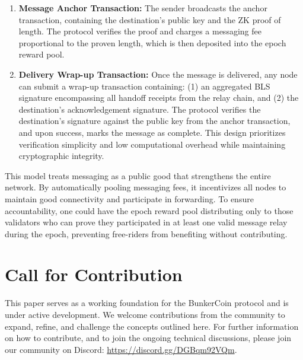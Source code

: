 \documentclass{article}
\begin{document}
\begin{enumerate}
    \item \textbf{Message Anchor Transaction:} The sender broadcasts the anchor transaction, containing the destination's public key and the ZK proof of length. The protocol verifies the proof and charges a messaging fee proportional to the proven length, which is then deposited into the epoch reward pool.
    \item \textbf{Delivery Wrap-up Transaction:} Once the message is delivered, any node can submit a wrap-up transaction containing: (1) an aggregated BLS signature encompassing all handoff receipts from the relay chain, and (2) the destination's acknowledgement signature. The protocol verifies the destination's signature against the public key from the anchor transaction, and upon success, marks the message as complete. This design prioritizes verification simplicity and low computational overhead while maintaining cryptographic integrity.
\end{enumerate}

This model treats messaging as a public good that strengthens the entire network. By automatically pooling messaging fees, it incentivizes all nodes to maintain good connectivity and participate in forwarding. To ensure accountability, one could have the epoch reward pool distributing only to those validators who can prove they participated in at least one valid message relay during the epoch, 
preventing free-riders from benefiting without contributing.

\section{Call for Contribution}

This paper serves as a working foundation for the BunkerCoin protocol and is under active development. We welcome contributions from the community to expand, refine, and challenge the concepts outlined here. For further information on how to contribute, and to join the ongoing technical discussions, please join our community on Discord: \url{https://discord.gg/DGBqm92VQm}.
\end{document}
